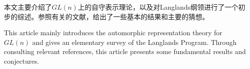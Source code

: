 
\begin{cabstract}
  本文主要介绍了$GL(n)$上的自守表示理论，以及对Langlands纲领进行了一个初步的综述。参照有关的文献，给出了一些基本的结果和主要的猜想。
\end{cabstract}


\begin{eabstract}
   This article mainly introduces the automorphic representation theory for $GL(n)$ and gives an elementary survey of the Langlands Program. Through consulting relevant references, this article presents some fundamental results and conjectures.
\end{eabstract}

